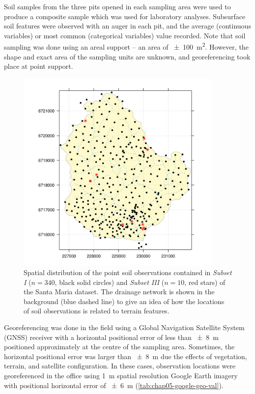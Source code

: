 Soil samples from the three pits opened in each sampling area were used to produce a composite sample which 
was used for laboratory analyses. Subsurface soil features were observed with an auger in each pit, and the 
average (continuous variables) or most common (categorical variables) value recorded. Note that soil sampling 
was done using an areal support -- an area of \SI{\pm100}{\metre\squared}. However, the shape and exact area of 
the sampling units are unknown, and georeferencing took place at point support.

\begin{figure}[!ht]
\centering
\includegraphics[width=0.90\textwidth]{fig/chap04-subsets-I-III}
\caption[Spatial distribution of \emph{Subset I} and \emph{Subset III}.]{Spatial distribution of the point 
soil observations contained in \emph{Subset I} ($n = 340$, black solid circles) and \emph{Subset III} ($n = 
10$, red stars) of the Santa Maria dataset. The drainage network is shown in the background (blue 
dashed line) to give an idea of how the locations of soil observations is related to terrain features.}
\label{fig:chap04-subsets-I-III}
\end{figure}

Georeferencing was done in the field using a Global Navigation Satellite System (GNSS) receiver with a 
horizontal positional error of less than \SI{\pm8}{\metre} positioned approximately at the centre of the
sampling area. Sometimes, the horizontal positional error was larger than \SI{\pm8}{\metre} due the effects
of vegetation, terrain, and satellite configuration. In these cases, observation locations 
were georeferenced in the office using \SI{1}{\metre} spatial resolution Google Earth\rr{} imagery 
with positional horizontal error of \SI{\pm6}{\metre} (\autoref{tab:chap05-google-geo-val}).

